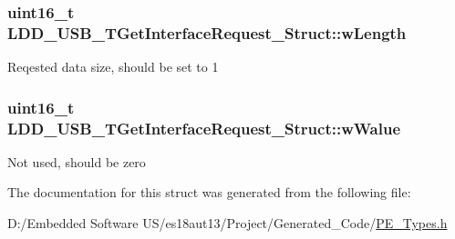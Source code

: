 \subsubsection[{w\+Length}]{\setlength{\rightskip}{0pt plus 5cm}uint16\+\_\+t L\+D\+D\+\_\+\+U\+S\+B\+\_\+\+T\+Get\+Interface\+Request\+\_\+\+Struct\+::w\+Length}\label{struct_l_d_d___u_s_b___t_get_interface_request___struct_a2aa1550fc5e72002a94c74ea0957ec74}
Reqested data size, should be set to 1 \hypertarget{struct_l_d_d___u_s_b___t_get_interface_request___struct_a48bcaf6af044e3e9669f5ea634a2b9fe}{}
\subsubsection[{w\+Walue}]{\setlength{\rightskip}{0pt plus 5cm}uint16\+\_\+t L\+D\+D\+\_\+\+U\+S\+B\+\_\+\+T\+Get\+Interface\+Request\+\_\+\+Struct\+::w\+Walue}\label{struct_l_d_d___u_s_b___t_get_interface_request___struct_a48bcaf6af044e3e9669f5ea634a2b9fe}
Not used, should be zero 

The documentation for this struct was generated from the following file\+:\begin{DoxyCompactItemize}
\item 
D\+:/\+Embedded Software U\+S/es18aut13/\+Project/\+Generated\+\_\+\+Code/\hyperlink{_p_e___types_8h}{P\+E\+\_\+\+Types.\+h}\end{DoxyCompactItemize}
